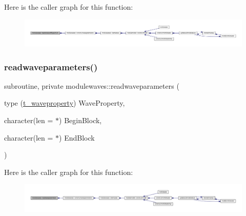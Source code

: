 Here is the caller graph for this function\+:\nopagebreak
\begin{figure}[H]
\begin{center}
\leavevmode
\includegraphics[width=350pt]{namespacemodulewaves_a8f1215445f8fd38dbf41e7339b28cf9f_icgraph}
\end{center}
\end{figure}
\mbox{\label{namespacemodulewaves_a5465d7c0bebb4ccf791eba8d2dfb8a8d}} 
\subsubsection{\texorpdfstring{readwaveparameters()}{readwaveparameters()}}
{\footnotesize\ttfamily subroutine, private modulewaves\+::readwaveparameters (\begin{DoxyParamCaption}\item[{type (\mbox{\hyperlink{structmodulewaves_1_1t__waveproperty}{t\+\_\+waveproperty}})}]{Wave\+Property,  }\item[{character(len = $\ast$)}]{Begin\+Block,  }\item[{character(len = $\ast$)}]{End\+Block }\end{DoxyParamCaption})\hspace{0.3cm}{\ttfamily [private]}}

Here is the caller graph for this function\+:\nopagebreak
\begin{figure}[H]
\begin{center}
\leavevmode
\includegraphics[width=350pt]{namespacemodulewaves_a5465d7c0bebb4ccf791eba8d2dfb8a8d_icgraph}
\end{center}
\end{figure}
\mbox{\label{namespacemodulewaves_abfbc4de9c60ff461e62bcb11b5e7aad8}} 
